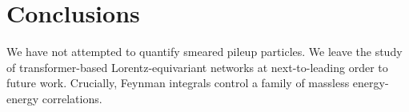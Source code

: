 \section{Conclusions}\label{sec:conclusions}

We have not attempted to quantify smeared pileup particles. We leave the
study of transformer-based Lorentz-equivariant networks at
next-to-leading order to future work. Crucially, Feynman integrals
control a family of massless energy-energy correlations.


